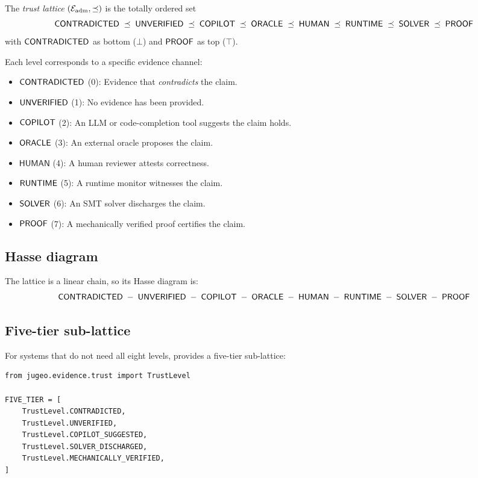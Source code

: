 \documentclass[11pt]{article}
\begin{document}
\begin{definition}\label{def:lattice}
The \emph{trust lattice} $(\mathcal{E}_{\mathrm{adm}}, \preceq)$ is the totally ordered set
\[
  \mathsf{CONTRADICTED} \;\preceq\; \mathsf{UNVERIFIED} \;\preceq\; \mathsf{COPILOT} \;\preceq\;
  \mathsf{ORACLE} \;\preceq\; \mathsf{HUMAN} \;\preceq\;
  \mathsf{RUNTIME} \;\preceq\; \mathsf{SOLVER} \;\preceq\; \mathsf{PROOF}
\]
with $\mathsf{CONTRADICTED}$ as bottom ($\bot$) and $\mathsf{PROOF}$ as top ($\top$).
\end{definition}

Each level corresponds to a specific evidence channel:

\begin{itemize}[nosep]
  \item $\mathsf{CONTRADICTED}$ (0): Evidence that \emph{contradicts} the claim.
  \item $\mathsf{UNVERIFIED}$ (1): No evidence has been provided.
  \item $\mathsf{COPILOT}$ (2): An LLM or code-completion tool suggests
        the claim holds.
  \item $\mathsf{ORACLE}$ (3): An external oracle proposes the claim.
  \item $\mathsf{HUMAN}$ (4): A human reviewer attests correctness.
  \item $\mathsf{RUNTIME}$ (5): A runtime monitor witnesses the claim.
  \item $\mathsf{SOLVER}$ (6): An SMT solver discharges the claim.
  \item $\mathsf{PROOF}$ (7): A mechanically verified proof certifies
        the claim.
\end{itemize}

\subsection{Hasse diagram}

The lattice is a linear chain, so its Hasse diagram is:
\[
  \mathsf{CONTRADICTED} \;-\; \mathsf{UNVERIFIED} \;-\; \mathsf{COPILOT} \;-\;
  \mathsf{ORACLE} \;-\; \mathsf{HUMAN} \;-\;
  \mathsf{RUNTIME} \;-\; \mathsf{SOLVER} \;-\; \mathsf{PROOF}
\]

\subsection{Five-tier sub-lattice}

For systems that do not need all eight levels, \JuGeo{}
provides a five-tier sub-lattice:

\begin{lstlisting}[caption={Five-tier sub-lattice.},label=lst:five-tier]
from jugeo.evidence.trust import TrustLevel

FIVE_TIER = [
    TrustLevel.CONTRADICTED,
    TrustLevel.UNVERIFIED,
    TrustLevel.COPILOT_SUGGESTED,
    TrustLevel.SOLVER_DISCHARGED,
    TrustLevel.MECHANICALLY_VERIFIED,
]
\end{lstlisting}
\end{document}
